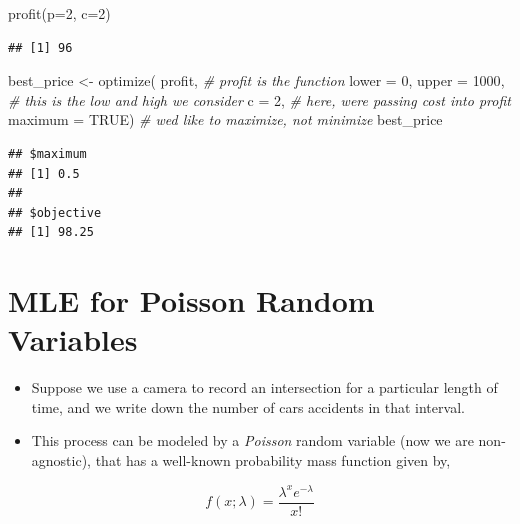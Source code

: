 \documentclass[
]{book}
\newenvironment{Shaded}{\begin{snugshade}}{\end{snugshade}}
\newcommand{\AttributeTok}[1]{\textcolor[rgb]{0.77,0.63,0.00}{#1}}
\newcommand{\CommentTok}[1]{\textcolor[rgb]{0.56,0.35,0.01}{\textit{#1}}}
\newcommand{\ConstantTok}[1]{\textcolor[rgb]{0.00,0.00,0.00}{#1}}
\newcommand{\DecValTok}[1]{\textcolor[rgb]{0.00,0.00,0.81}{#1}}
\newcommand{\FunctionTok}[1]{\textcolor[rgb]{0.00,0.00,0.00}{#1}}
\newcommand{\NormalTok}[1]{#1}
\newcommand{\OtherTok}[1]{\textcolor[rgb]{0.56,0.35,0.01}{#1}}
\providecommand{\tightlist}{%
  \setlength{\itemsep}{0pt}\setlength{\parskip}{0pt}}
\theoremstyle{definition}
\theoremstyle{definition}
\theoremstyle{definition}
\theoremstyle{definition}
\theoremstyle{remark}
\begin{document}
\begin{Shaded}
\begin{Highlighting}[]
\FunctionTok{profit}\NormalTok{(}\AttributeTok{p=}\DecValTok{2}\NormalTok{, }\AttributeTok{c=}\DecValTok{2}\NormalTok{)}
\end{Highlighting}
\end{Shaded}

\begin{verbatim}
## [1] 96
\end{verbatim}

\begin{Shaded}
\begin{Highlighting}[]
\NormalTok{best\_price }\OtherTok{\textless{}{-}} \FunctionTok{optimize}\NormalTok{(}
\NormalTok{  profit,                    }\CommentTok{\# profit is the function}
  \AttributeTok{lower =} \DecValTok{0}\NormalTok{, }\AttributeTok{upper =} \DecValTok{1000}\NormalTok{,   }\CommentTok{\# this is the low and high we consider}
  \AttributeTok{c =} \DecValTok{2}\NormalTok{,                     }\CommentTok{\# here, we\textquotesingle{}re passing cost into profit}
  \AttributeTok{maximum =} \ConstantTok{TRUE}\NormalTok{)            }\CommentTok{\# we\textquotesingle{}d like to maximize, not minimize}
\NormalTok{best\_price}
\end{Highlighting}
\end{Shaded}

\begin{verbatim}
## $maximum
## [1] 0.5
## 
## $objective
## [1] 98.25
\end{verbatim}

\hypertarget{mle-for-poisson-random-variables}{%
\section{MLE for Poisson Random Variables}\label{mle-for-poisson-random-variables}}

\begin{itemize}
\tightlist
\item
  Suppose we use a camera to record an intersection for a particular length of time, and we write down the number of cars accidents in that interval.\\
\item
  This process can be modeled by a \emph{Poisson} random variable (now we are non-agnostic), that has a well-known probability mass function given by,
\end{itemize}

\[
f(x;\lambda) = \frac{\lambda^x e^{-\lambda}}{x!}
\]
\end{document}
